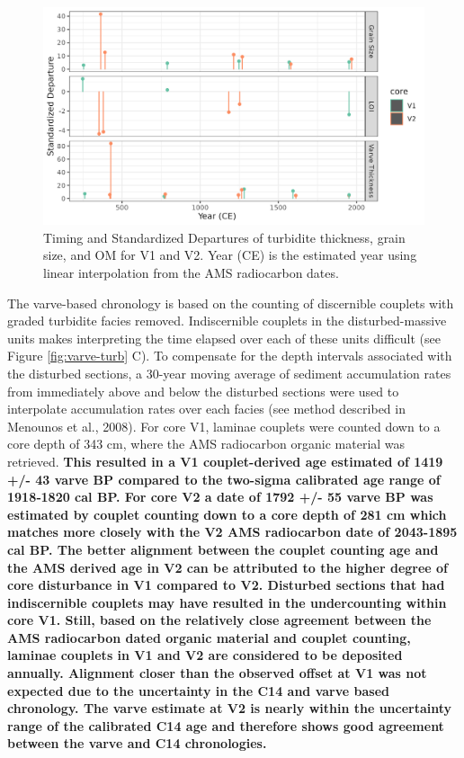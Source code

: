 \documentclass[Royal,times,doublespace,sageh]{sagej}
\begin{document}
\begin{figure}

{\centering \includegraphics[width=1\linewidth]{../figs/turbidite_plot} 

}

\caption{Timing and Standardized Departures of turbidite thickness, grain size, and OM for V1 and V2. Year (CE) is the estimated year using linear interpolation from the AMS radiocarbon dates.\label{turbScatter}}\label{fig:turbScatter}
\end{figure}

The varve-based chronology is based on the counting of discernible
couplets with graded turbidite facies removed. Indiscernible couplets in
the disturbed-massive units makes interpreting the time elapsed over
each of these units difficult (see Figure \ref{fig:varve-turb} C). To
compensate for the depth intervals associated with the disturbed
sections, a 30-year moving average of sediment accumulation rates from
immediately above and below the disturbed sections were used to
interpolate accumulation rates over each facies (see method described in
Menounos et al., 2008). For core V1, laminae couplets were counted down
to a core depth of 343 cm, where the AMS radiocarbon organic material
was retrieved. \textbf{This resulted in a V1 couplet-derived age
estimated of 1419 +/- 43 varve BP compared to the two-sigma calibrated
age range of 1918‐1820 cal BP. For core V2 a date of 1792 +/- 55 varve
BP was estimated by couplet counting down to a core depth of 281 cm
which matches more closely with the V2 AMS radiocarbon date of 2043-1895
cal BP. The better alignment between the couplet counting age and the
AMS derived age in V2 can be attributed to the higher degree of core
disturbance in V1 compared to V2. Disturbed sections that had
indiscernible couplets may have resulted in the undercounting within
core V1. Still, based on the relatively close agreement between the AMS
radiocarbon dated organic material and couplet counting, laminae
couplets in V1 and V2 are considered to be deposited annually. Alignment
closer than the observed offset at V1 was not expected due to the
uncertainty in the C14 and varve based chronology. The varve estimate at
V2 is nearly within the uncertainty range of the calibrated C14 age and
therefore shows good agreement between the varve and C14 chronologies.}
\end{document}
